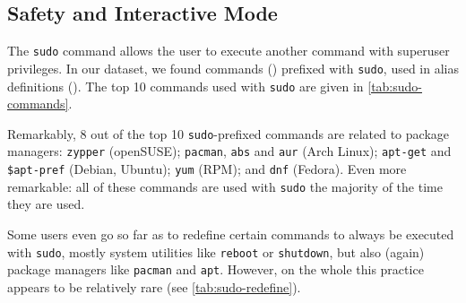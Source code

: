 \subsection{Safety and Interactive Mode}

The \texttt{sudo} command allows the user to execute another command with superuser privileges.
In our dataset, we found  commands () prefixed with \texttt{sudo}, used in  alias definitions ().
The top 10 commands used with \texttt{sudo} are given in \cref{tab:sudo-commands}.

Remarkably, 8 out of the top 10 \texttt{sudo}-prefixed commands are related to package managers:
\texttt{zypper} (openSUSE); \texttt{pacman}, \texttt{abs} and \texttt{aur} (Arch Linux); \verb|apt-get| and \verb|$apt-pref| (Debian, Ubuntu); \texttt{yum} (RPM); and \texttt{dnf} (Fedora).
Even more remarkable: all of these commands are used with \texttt{sudo} the majority of the time they are used.

Some users even go so far as to redefine certain commands to always be executed with \texttt{sudo}, mostly system utilities like \texttt{reboot} or \texttt{shutdown}, but also (again) package managers like \texttt{pacman} and \texttt{apt}.
However, on the whole this practice appears to be relatively rare (see \cref{tab:sudo-redefine}).

